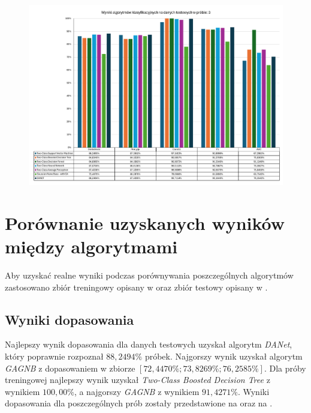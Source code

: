 \begin{landscape}
    \vspace*{\fill}
    \begin{figure}[H]
        \centering
        \includegraphics[height=0.8\textwidth]{images/predict_result_3}
        \label{fig:predict-result3}
    \end{figure}
    \vfill
\end{landscape}


\section{Porównanie uzyskanych wyników między algorytmami}
Aby uzyskać realne wyniki podczas porównywania poszczególnych algorytmów zastosowano zbiór treningowy opisany w  oraz zbiór testowy opisany w .

\subsection{Wyniki dopasowania}
Najlepszy wynik dopasowania dla danych testowych uzyskał algorytm \textit{DANet}, który poprawnie rozpoznał $88,2494\%$ próbek. Najgorszy wynik uzyskał algorytm \textit{GAGNB} z dopasowaniem w zbiorze $[72,4470\%; 73,8269\%; 76,2585\%]$. Dla próby treningowej najlepszy wynik uzyskał \textit{Two-Class Boosted Decision Tree} z wynikiem $100,00\%$, a najgorszy \textit{GAGNB} z wynikiem $91,4271\%$. Wyniki dopasowania dla poszczególnych prób zostały przedstawione na  oraz na .

